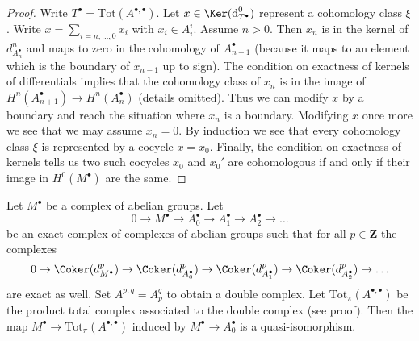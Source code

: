 \begin{proof}
Write $T^\bullet = \text{Tot}(A^{\bullet, \bullet})$.
Let $x \in \Ker(\text{d}_{T^\bullet}^0)$ represent a
cohomology class $\xi$.
Write $x = \sum_{i = n, \ldots, 0} x_i$ with $x_i \in A_i^i$.
Assume $n > 0$. Then $x_n$ is in the kernel of $d_{A_n^\bullet}^n$
and maps to zero in the cohomology of $A_{n - 1}^\bullet$ (because it maps
to an element which is the boundary of $x_{n - 1}$ up to sign).
The condition on exactness of kernels of differentials implies
that the cohomology class of $x_n$ is in the image of
$H^n(A_{n + 1}^\bullet) \to H^n(A_n^\bullet)$ (details omitted).
Thus we can modify $x$ by a boundary and reach the situation
where $x_n$ is a boundary. Modifying $x$ once more we see that
we may assume $x_n = 0$. By induction we see that every cohomology
class $\xi$ is represented by a cocycle $x = x_0$.
Finally, the condition on exactness of kernels tells us
two such cocycles $x_0$ and $x_0'$ are cohomologous if
and only if their image in $H^0(M^\bullet)$ are the same.
\end{proof}

\begin{lemma}
\label{lemma-good-right-resolution-gives-qis}
Let $M^\bullet$ be a complex of abelian groups. Let
$$
0 \to M^\bullet \to A_0^\bullet \to A_1^\bullet \to A_2^\bullet \to \ldots
$$
be an exact complex of complexes of abelian groups
such that for all $p \in \mathbf{Z}$ the complexes
$$
0 \to
\Coker(d_{M^\bullet}^p) \to
\Coker(d_{A_0^\bullet}^p) \to
\Coker(d_{A_1^\bullet}^p) \to
\Coker(d_{A_2^\bullet}^p) \to \ldots
$$
are exact as well. Set $A^{p, q} = A_p^q$ to obtain a double
complex. Let $\text{Tot}_\pi(A^{\bullet, \bullet})$ be the
product total complex associated to the double complex
(see proof). Then the map
$M^\bullet \to \text{Tot}_\pi(A^{\bullet, \bullet})$
induced by $M^\bullet \to A_0^\bullet$ is a quasi-isomorphism.
\end{lemma}

